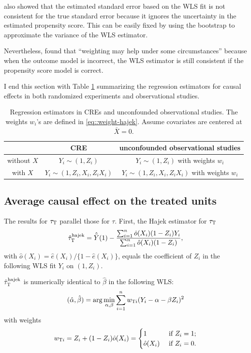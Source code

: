 \citet{freedman2008weighting}  also showed that the estimated standard error based on the WLS fit is not consistent for the true standard error because it ignores the uncertainty in the estimated propensity score. This can be easily fixed by using the bootstrap to approximate the variance of the WLS estimator. 


Nevertheless, \citet{freedman2008weighting}  found that ``weighting may help under some circumstances'' because when the outcome model is incorrect, the WLS estimator is still consistent if the propensity score model is correct. 



I end this section with Table \ref{table::regression-causal-cre-obs} summarizing the regression estimators for causal effects in both randomized experiments and observational studies. 



\begin{table}
\caption{Regression estimators in  CREs and unconfounded observational studies. The weights $w_i$'s are defined in \eqref{eq::weight-hajek}.
Assume covariates are centered at $\bar{X} = 0$.}\label{table::regression-causal-cre-obs}
\begin{tabular}{|c|cc|}
\hline 
 & CRE & unconfounded observational studies \\
 \hline 
without $X$ &  $Y_i\sim (1, Z_i)$ & $Y_i\sim (1, Z_i)$ with weights $w_i$   \\
with $X$ & $Y_i\sim (1, Z_i ,X_i, Z_i X_i ) $ & $Y_i\sim (1, Z_i ,X_i, Z_i X_i )$ with weights $w_i$  \\
\hline 
\end{tabular}
\end{table}



\subsection{Average causal effect on the treated units}

The results for $\tau_\textsc{T}$ parallel those for $\tau$. First, the Hajek estimator for $\tau_\textsc{T}$
$$
\hat{\tau}_\textsc{T}^\text{hajek} = \hat{\bar{Y}}(1) 
- \frac{  \sum_{i=1}^n \hat{o}(X_i) (1-Z_i) Y_i }{ \sum_{i=1}^n \hat{o}(X_i) (1-Z_i) } ,
$$
with $\hat{o}(X_i) = \hat{e}(X_i) / \{ 1- \hat{e}(X_i) \}$, 
equals the coefficient of $Z_i$ in the following WLS fit  $Y_i$ on $(1,Z_i)$.


\begin{proposition}
\label{prop::hajek-att}
$\hat\tau_\textsc{T}^{\text{hajek}}$ is numerically identical to $\hat{\beta}$ in the following WLS:
$$
(\hat{\alpha}, \hat{\beta}) = \arg\min_{\alpha, \beta} \sum_{i=1}^n  w_{\textsc{T}i}  (Y_i - \alpha - \beta Z_i)^2
$$
 with weights 
\begin{eqnarray}\label{eq::weight-hajek-att}
w_{\textsc{T}i} = Z_i +(1-Z_i )  \hat{o}(X_i)
= 
\begin{cases}
1 & \text{ if } Z_i=1;\\
 \hat{o}(X_i)   & \text{ if } Z_i=0.
\end{cases} 
\end{eqnarray}
\end{proposition}

